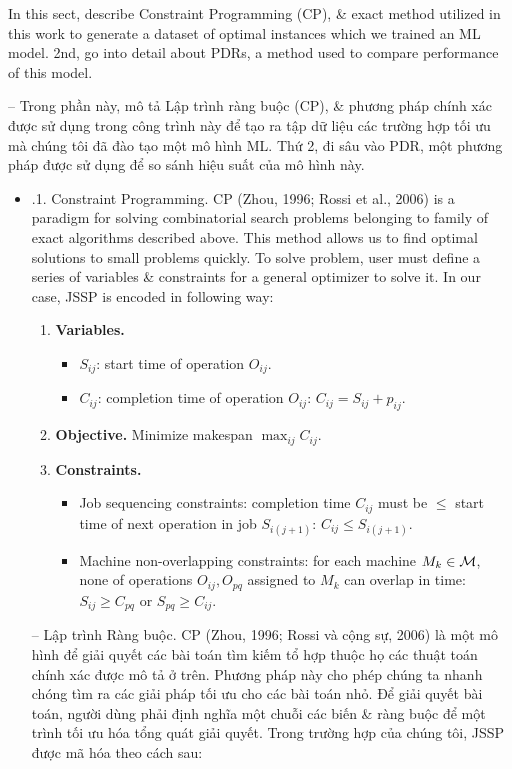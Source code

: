 \documentclass{article}
\begin{document}
\begin{itemize}
\begin{itemize}
        In this sect, describe Constraint Programming (CP), \& exact method utilized in this work to generate a dataset of optimal instances which we trained an ML model. 2nd, go into detail about PDRs, a method used to compare performance of this model.

        -- Trong phần này, mô tả Lập trình ràng buộc (CP), \& phương pháp chính xác được sử dụng trong công trình này để tạo ra tập dữ liệu các trường hợp tối ưu mà chúng tôi đã đào tạo một mô hình ML. Thứ 2, đi sâu vào PDR, một phương pháp được sử dụng để so sánh hiệu suất của mô hình này.
        \begin{itemize}
            \item {.1. Constraint Programming.} CP (Zhou, 1996; Rossi et al., 2006) is a paradigm for solving combinatorial search problems belonging to family of exact algorithms described above. This method allows us to find optimal solutions to small problems quickly. To solve problem, user must define a series of variables \& constraints for a general optimizer to solve it. In our case, JSSP is encoded in following way:
            \begin{enumerate}
                \item {\bf Variables.}
                \begin{itemize}
                    \item $S_{ij}$: start time of operation $O_{ij}$.
                    \item $C_{ij}$: completion time of operation $O_{ij}$: $C_{ij} = S_{ij} + p_{ij}$.
                \end{itemize}
                \item {\bf Objective.} Minimize makespan $\max_{ij} C_{ij}$.
                \item {\bf Constraints.}
                \begin{itemize}
                    \item Job sequencing constraints: completion time $C_{ij}$ must be $\le$ start time of next operation in job $S_{i(j + 1)}$: $C_{ij}\le S_{i(j + 1)}$.
                    \item Machine non-overlapping constraints: for each machine $M_k\in{\cal M}$, none of operations $O_{ij},O_{pq}$ assigned to $M_k$ can overlap in time: $S_{ij}\ge C_{pq}$ or $S_{pq}\ge C_{ij}$.
                \end{itemize}
            \end{enumerate}
            -- {\sf Lập trình Ràng buộc.} CP (Zhou, 1996; Rossi và cộng sự, 2006) là một mô hình để giải quyết các bài toán tìm kiếm tổ hợp thuộc họ các thuật toán chính xác được mô tả ở trên. Phương pháp này cho phép chúng ta nhanh chóng tìm ra các giải pháp tối ưu cho các bài toán nhỏ. Để giải quyết bài toán, người dùng phải định nghĩa một chuỗi các biến \& ràng buộc để một trình tối ưu hóa tổng quát giải quyết. Trong trường hợp của chúng tôi, JSSP được mã hóa theo cách sau:

\end{itemize}
\end{itemize}
\end{itemize}
\end{document}
